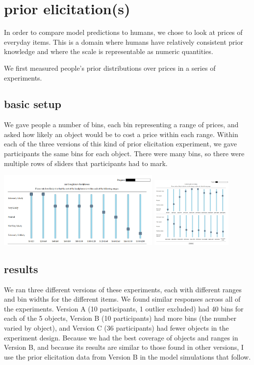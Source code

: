 \documentclass[10pt]{article}
\begin{document}
\section{prior elicitation(s)}
  In order to compare model predictions to humans, we chose to look at prices of everyday items. This is a domain where humans have relatively consistent prior knowledge and where the scale is representable as numeric quantities.
  
  We first measured people's prior distributions over prices in a series of experiments.

  \subsection{basic setup}
    We gave people a number of bins, each bin representing a range of prices, and asked how likely an object would be to cost a price within each range. Within each of the three versions of this kind of prior elicitation experiment, we gave participants the same bins for each object. There were many bins, so there were multiple rows of sliders that participants had to mark.
  
    \includegraphics[width=0.6\textwidth]{screenshot1.png}
    \includegraphics[width=0.3\textwidth]{screenshot2.png}
    
  \subsection{results}
    We ran three different versions of these experiments, each with different ranges and bin widths for the different items. We found similar responses across all of the experiments. Version A (10 participants, 1 outlier excluded) had 40 bins for each of the 5 objects, Version B (10 participants) had more bins (the number varied by object), and Version C (36 participants) had fewer objects in the experiment design. Because we had the best coverage of objects and ranges in Version B, and because its results are similar to those found in other versions, I use the prior elicitation data from Version B in the model simulations that follow.
    
\end{document}

